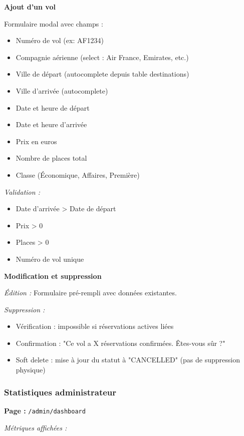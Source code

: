 \documentclass[12pt,a4paper]{report}
\begin{document}
\textbf{Ajout d'un vol}

Formulaire modal avec champs :
\begin{itemize}
    \item Numéro de vol (ex: AF1234)
    \item Compagnie aérienne (select : Air France, Emirates, etc.)
    \item Ville de départ (autocomplete depuis table destinations)
    \item Ville d'arrivée (autocomplete)
    \item Date et heure de départ
    \item Date et heure d'arrivée
    \item Prix en euros
    \item Nombre de places total
    \item Classe (Économique, Affaires, Première)
\end{itemize}

\textit{Validation :}
\begin{itemize}
    \item Date d'arrivée > Date de départ
    \item Prix > 0
    \item Places > 0
    \item Numéro de vol unique
\end{itemize}

\textbf{Modification et suppression}

\textit{Édition :} Formulaire pré-rempli avec données existantes.

\textit{Suppression :}
\begin{itemize}
    \item Vérification : impossible si réservations actives liées
    \item Confirmation : "Ce vol a X réservations confirmées. Êtes-vous sûr ?"
    \item Soft delete : mise à jour du statut à "CANCELLED" (pas de suppression physique)
\end{itemize}

\subsubsection{Statistiques administrateur}

\textbf{Page :} \texttt{/admin/dashboard}

\textit{Métriques affichées :}
\end{document}
